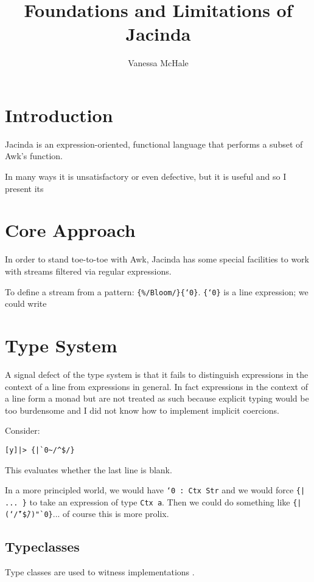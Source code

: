 \documentclass{report}
\begin{document}
\title{Foundations and Limitations of Jacinda}
\author {Vanessa McHale}
\maketitle

\tableofcontents

\section{Introduction}

Jacinda is an expression-oriented, functional language that performs a subset of Awk's function.

In many ways it is unsatisfactory or even defective, but it is useful and so I present its

\section{Core Approach}

In order to stand toe-to-toe with Awk, Jacinda has some special facilities to work with streams filtered via regular expressions.

To define a stream from a pattern: {\tt \{\%/Bloom/\}\{`0\}}. {\tt\{`0\}} is a line expression; we could write

\section{Type System}

A signal defect of the type system is that it fails to distinguish expressions in the context of a line from expressions in general. In fact expressions in the context of a line form a monad but are not treated as such because explicit typing would be too burdensome and I did not know how to implement implicit coercions.

Consider:

\begin{verbatim}
[y]|> {|`0~/^$/}
\end{verbatim}

This evaluates whether the last line is blank.

\newcommand\Tilde{\char`\~}
\newcommand\Caret{\char`\^}

In a more principled world, we would have {\tt `0 : Ctx Str} and we would force {\tt \{| ... \}} to take an expression of type {\tt Ctx a}. Then we could do something like {\tt \{|(\Tilde/\Caret\$/)"`0\}}... of course this is more prolix.

\subsection{Typeclasses}

Type classes are used to witness implementations \cite{adhoc}.



\end{document}
